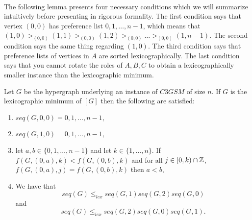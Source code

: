 \paragraph{}
The following lemma presents four necessary conditions which we will summarize intuitively before presenting in rigorous formality. The first condition says that vertex $(0,0)$ has preference list $0,1,\dots, n-1$, which means that $(1,0) >_{(0,0)} (1,1) >_{(0,0)} (1,2) >_{(0,0)}\dots >_{(0,0)} (1,n-1).$ The second condition says the same thing regarding $(1,0)$. The third condition says that preference lists of vertices in $A$ are sorted lexicographically. The last condition says that you cannot rotate the roles of $A,B,C$ to obtain a lexicographically smaller instance than the lexicographic minimum.
\begin{lemma}\label{lemma:nec-symmetry}
Let $G$ be the hypergraph underlying an instance of $C3GSM$ of size $n$. If $G$ is the lexicographic minimum of $[G]$ then the following are satisfied:
\begin{enumerate}
\item $seq(G,0,0) = 0,1,\dots,n-1$,
\item $seq(G,1,0) = 0,1,\dots,n-1$,
\item let $a, b \in \{0,1,\dots, n-1\}$ and let $k \in \{1,\dots,n\}$. If $f(G,(0,a), k) < f(G,(0,b), k)$ and for all $j \in [0,k) \cap \mathbb{Z}$, $f(G,(0,a),j) =f(G,(0,b),k)$ then $a < b$,
\item We have that $$seq(G) \leq_{lex} seq(G,1)seq(G,2)seq(G,0)$$ and $$seq(G) \leq_{lex} seq(G,2)seq(G,0)seq(G,1).$$
\end{enumerate}
\end{lemma}
